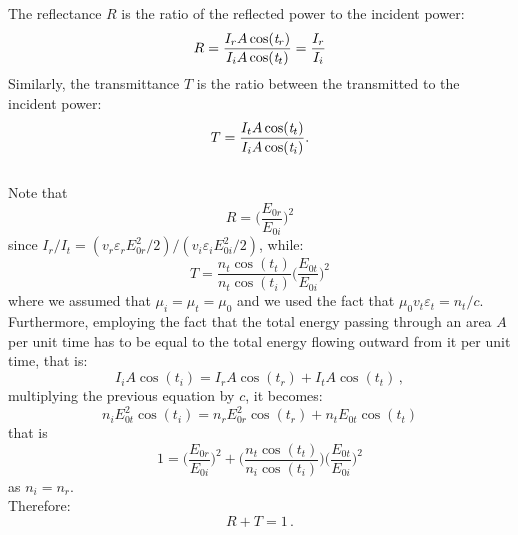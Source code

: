 The reflectance $R$ is the ratio of the reflected power to the incident power:
\begin{equation}\label{reflectance}
R = \frac{I_r A \cos(\textit{t}_r)}{I_i A \cos(\textit{t}_t)} = \frac{I_r}{I_i}
\end{equation}
Similarly, the transmittance $T$ is the ratio between the transmitted to the incident power:
\begin{equation}\label{transmittance}
T = \frac{I_t A \cos(\textit{t}_t)}{I_i A \cos(\textit{t}_i)} .
\end{equation}\\
Note that 
\begin{equation}\label{R}
R = \Big(\frac{E_{0 r}}{E_{0 i}}\Big)^2
\end{equation}
since $ I_r/I_t = (v_r\varepsilon_r E_{0r}^2/2)/(v_i\varepsilon_i E_{0i}^2/2)$, 
while: \begin{equation}\label{T}
T = \frac{n_t \cos(t_t)}{n_t \cos(t_i)}\Big(\frac{E_{0 t}}{E_{0 i}}\Big)^2
\end{equation}
where we assumed that $\mu_i = \mu_t  = \mu_0$ and we used the fact that $\mu_0 v_t\varepsilon_t=n_t/c$.
Furthermore, employing the fact that the total energy passing through an area $A$ per unit time has to be equal to the total energy flowing outward from it per unit time, that is:
\begin{equation}
I_i A\cos(t_i) = I_r A\cos(t_r)+I_t A\cos(t_t)\,,
\end{equation}
multiplying the previous equation by $c$, it becomes:
\begin{equation}
n_i E_{0 t}^2 \cos(t_i) = n_r E_{0r}^2\cos(t_r)+n_tE_{0t}\cos(t_t)
\end{equation}
that is
\begin{equation}
1 = \Bigg(\frac{E_{0r}}{E_{0i}}\Bigg)^2+\Bigg(\frac{n_t\cos(t_t)}{n_i\cos(t_i)}\Bigg)\Bigg(\frac{E_{0t}}{E_{0i}}\Bigg)^2
\end{equation}
as $n_i = n_r$. \\ 
Therefore:
\begin{equation}
R+T=1\,.
\end{equation}
